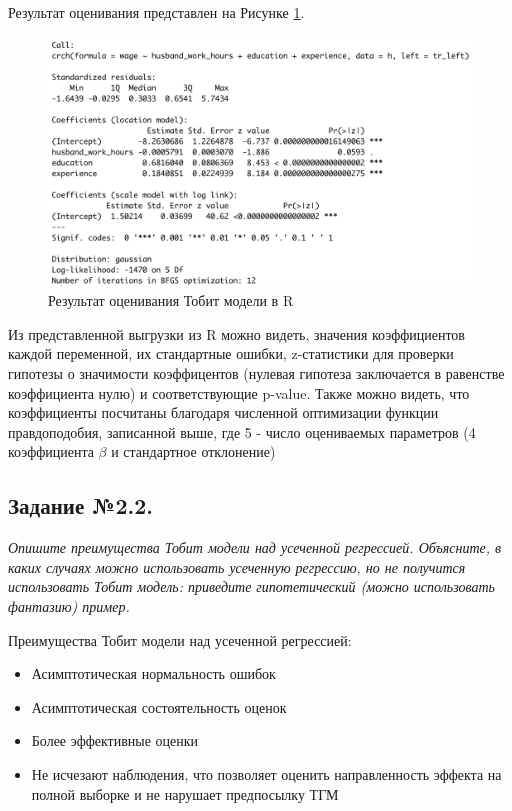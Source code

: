 \documentclass[a4paper,12pt]{article}
\begin{document}
\vspace{0.2cm}

Результат оценивания представлен на Рисунке \ref{tobit}.

\begin{figure}[!h] \centering
	\caption{Результат оценивания Тобит модели в R}
	\label{tobit}
	\includegraphics[scale=0.7]{tobit1.png}
\end{figure}

Из представленной выгрузки из R можно видеть, значения коэффициентов каждой переменной, их стандартные ошибки, z-статистики для проверки гипотезы о значимости коэффицентов (нулевая гипотеза заключается в равенстве коэффициента нулю) и соответствующие p-value. Также можно видеть, что коэффициенты посчитаны благодаря численной оптимизации функции правдоподобия, записанной выше, где 5 - число оцениваемых параметров (4 коэффициента $\beta$ и стандартное отклонение)

\subsection{Задание №2.2.}
\textit{Опишите преимущества Тобит модели над усеченной регрессией. Объясните, в
каких случаях можно использовать усеченную регрессию, но не получится использовать
Тобит модель: приведите гипотетический (можно использовать фантазию) пример.}

\vspace{0.2cm}

Преимущества Тобит модели над усеченной регрессией:

\begin{itemize}
	\item  Асимптотическая нормальность ошибок
	
	\item Асимптотическая состоятельность оценок 
	
	\item Более эффективные оценки 
	
	\item Не исчезают наблюдения, что позволяет оценить направленность эффекта на полной выборке и не нарушает предпосылку ТГМ
	
\end{itemize}
\end{document}
